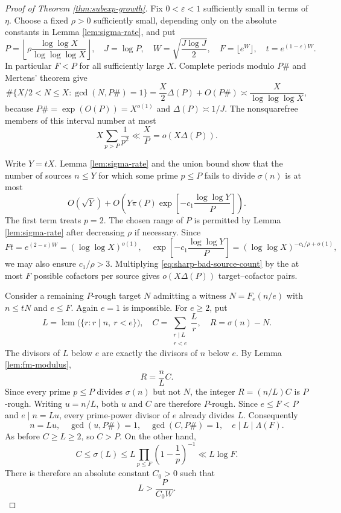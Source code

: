 \documentclass[11pt,letterpaper,reqno]{amsart}
\numberwithin{equation}{section}
\theoremstyle{remark}
\newcommand{\1}{\mathbf 1}
\DeclareMathOperator{\lcm}{lcm}
\renewcommand{\leq}{\leqslant}
\renewcommand{\geq}{\geqslant}
\begin{document}
\begin{proof}[Proof of Theorem \ref{thm:subexp-growth}]
Fix $0<\varepsilon<1$ sufficiently small in terms of $\eta$. Choose a fixed
$\rho>0$ sufficiently small, depending only on the absolute constants in
Lemma \ref{lem:sigma-rate}, and put
\[
 P=\left\lfloor\rho\frac{\log\log X}{\log\log\log X}\right\rfloor,
 \quad J=\log P,
 \quad W=\sqrt{\frac{J\log J}{2}},
 \quad F=\lfloor e^W\rfloor,
 \quad t=e^{(1-\varepsilon)W}.
\]
In particular $F<P$ for all sufficiently large $X$. Complete periods modulo
$P\#$ and Mertens' theorem give
\begin{equation}\label{eq:sharp-rough-target-count}
 \#\{X/2<N\leq X:\gcd(N,P\#)=1\}
 =\frac X2\Delta(P)+O(P\#)
 \asymp\frac X{\log\log\log X},
\end{equation}
because $P\#=\exp(O(P))=X^{o(1)}$ and $\Delta(P)\asymp1/J$. The
nonsquarefree members of this interval number at most
\[
 X\sum_{p>P}\frac1{p^2}\ll\frac XP=o(X\Delta(P)).
\]

Write $Y=tX$. Lemma \ref{lem:sigma-rate} and the union bound show that the
number of sources $n\leq Y$ for which some prime $p\leq P$ fails to divide
$\sigma(n)$ is at most
\begin{equation}\label{eq:sharp-bad-source-count}
 O(\sqrt Y)+O\left(
 Y\pi(P)\exp\left[-c_1\frac{\log\log Y}{P}\right]
 \right).
\end{equation}
The first term treats $p=2$. The chosen range of $P$ is permitted by
Lemma \ref{lem:sigma-rate} after decreasing $\rho$ if necessary. Since
\[
 Ft=e^{(2-\varepsilon)W}=(\log\log X)^{o(1)},
 \quad
 \exp\left[-c_1\frac{\log\log Y}{P}\right]
 =(\log\log X)^{-c_1/\rho+o(1)},
\]
we may also ensure $c_1/\rho>3$. Multiplying
\eqref{eq:sharp-bad-source-count} by the at most $F$ possible cofactors per
source gives $o(X\Delta(P))$ target--cofactor pairs.

Consider a remaining $P$-rough target $N$ admitting a witness
$N=F_e(n/e)$ with $n\leq tN$ and $e\leq F$. Again $e=1$ is impossible.
For $e\geq2$, put
\[
 L=\lcm\bigl(\{r:r\mid n,\ r<e\}\bigr),\quad
 C=\sum_{\substack{r\mid L\\r<e}}\frac Lr,\quad R=\sigma(n)-N.
\]
The divisors of $L$ below $e$ are exactly the divisors of $n$ below $e$.
By Lemma \ref{lem:fm-modulus},
\[
 R=\frac nL C.
\]
Since
every prime $p\leq P$ divides $\sigma(n)$ but not $N$, the integer
$R=(n/L)C$ is $P$-rough. Writing $u=n/L$, both $u$ and $C$ are therefore
$P$-rough. Since $e\leq F<P$ and $e\mid n=Lu$, every prime-power divisor
of $e$ already divides $L$. Consequently
\[
 n=Lu,\quad \gcd(u,P\#)=1,\quad \gcd(C,P\#)=1,
 \quad e\mid L\mid \Lambda(F).
\]
As before $C\geq L\geq2$, so $C>P$. On the other hand,
\[
 C\leq\sigma(L)
 \leq L\prod_{p\leq F}\left(1-\frac1p\right)^{-1}
 \ll L\log F.
\]
There is therefore an absolute constant $C_0>0$ such that
\begin{equation}\label{eq:moving-kernel-lower-bound}
 L>\frac P{C_0W}.
\end{equation}


\end{proof}
\end{document}
